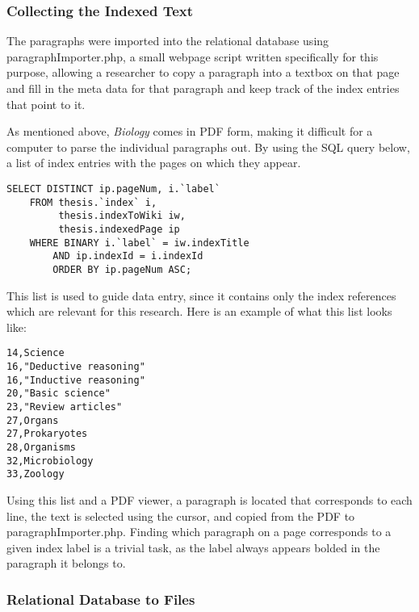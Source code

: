 \subsubsection{Collecting the Indexed Text}

The paragraphs were imported into the relational database using paragraphImporter.php, a small webpage script written specifically for this purpose, allowing a researcher to copy a paragraph into a textbox on that page and fill in the meta data for that paragraph and keep track of the index entries that point to it.

As mentioned above, {\it Biology} comes in PDF form, making it difficult for a computer to parse the individual paragraphs out.
By using the SQL query below, a list of index entries with the pages on which they appear.

\begin{lstlisting}
SELECT DISTINCT ip.pageNum, i.`label`
    FROM thesis.`index` i,
         thesis.indexToWiki iw,
         thesis.indexedPage ip
    WHERE BINARY i.`label` = iw.indexTitle
        AND ip.indexId = i.indexId
        ORDER BY ip.pageNum ASC;
\end{lstlisting}

This list is used to guide data entry, since it contains only the index references which are relevant for this research.
Here is an example of what this list looks like:

\begin{multicols}{2}
\begin{verbatim}
14,Science
16,"Deductive reasoning"
16,"Inductive reasoning"
20,"Basic science"
23,"Review articles"
27,Organs
27,Prokaryotes
28,Organisms
32,Microbiology
33,Zoology
\end{verbatim}
\end{multicols}

Using this list and a PDF viewer, a paragraph is located that corresponds to each line, the text is selected using the cursor, and copied from the PDF to paragraphImporter.php.
Finding which paragraph on a page corresponds to a given index label is a trivial task, as the label always appears bolded in the paragraph it belongs to.

\subsubsection{Relational Database to Files}
\label{subsubsec:RDB2F}

